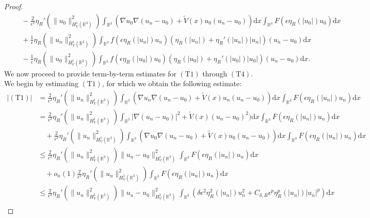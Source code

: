 \documentclass[12pt]{amsart}
\numberwithin{equation}{section}
\theoremstyle{definition}
\begin{document}
\begin{proof}
\begin{align}
     &\quad~- \frac{2}{\epsilon^2} \eta_R'(\|u_0\|_{H^1_{V}(\mathbb{R}^3)}^2) \int_{\mathbb{R}^3}(\nabla u_0\nabla (u_{n}-u_{0})+\tilde V(x)u_0(u_{n}-u_{0})) \text{d}x \int_{\mathbb{R}^3} F(\epsilon \eta_R(|u_0|) u_0)  \text{d}x \tag{T2} \\
    &\quad~+ \frac{1}{\epsilon} \eta_R(\|u_n\|_{H^1_{V}(\mathbb{R}^3)}^2) \int_{\mathbb{R}^3} f(\epsilon\eta_R(|u_n|) u_n) \left(\eta_R(|u_n|) + \eta_R'(|u_n|)|u_n| \right) (u_n-u_0) \text{d}x  \tag{T3}\\
    &\quad~- \frac{1}{\epsilon} \eta_R(\|u_0\|_{H^1_{V}(\mathbb{R}^3)}^2) \int_{\mathbb{R}^3} f(\epsilon \eta_R(|u_0|) u_0) \left(\eta_R(|u_0|) + \eta_R'(|u_0|)|u_0| \right) (u_n-u_0) \text{d}x. \tag{T4}
\end{align}
We now proceed to provide term-by-term estimates for $(\text{T}1)$ through $(\text{T}4)$. We begin by estimating $(\text{T}1)$, for which we obtain the following estimate:
\begin{equation*}
    \begin{aligned}
       \left | (\text{T}1)\right |&=\frac{2}{\epsilon^2} \eta_R'(\|u_n\|_{H^1_{V}(\mathbb{R}^3)}^2) \int_{\mathbb{R}^3}(\nabla u_n\nabla (u_{n}-u_{0})+\tilde V(x)u_n(u_{n}-u_{0})) \text{d}x \int_{\mathbb{R}^3} F(\epsilon \eta_R(|u_n|) u_n) \text{d}x\\
       &=\frac{2}{\epsilon^2} \eta_R'(\|u_n\|_{H^1_{V}(\mathbb{R}^3)}^2) \int_{\mathbb{R}^3}|\nabla (u_n-u_0)|^2+\tilde V(x)(u_{n}-u_{0})^2) \text{d}x \int_{\mathbb{R}^3} F(\epsilon \eta_R(|u_n|) u_n) \text{d}x\\
       &\quad+\frac{2}{\epsilon^2} \eta_R'(\|u_n\|_{H^1_{V}(\mathbb{R}^3)}^2) \int_{\mathbb{R}^3}(\nabla u_0\nabla (u_{n}-u_{0})+\tilde V(x)u_0(u_{n}-u_{0})) \text{d}x \int_{\mathbb{R}^3} F(\epsilon \eta_R(|u_n|) u_n) \text{d}x\\
       &\leq  \frac{2}{\epsilon^2} \eta_R'(\|u_n\|_{H^1_{V}(\mathbb{R}^3)}^2)\|u_n-u_0\|^2_{H^{1}_{V}(\mathbb{R}^3)}\int_{\mathbb{R}^3} F(\epsilon \eta_R(|u_n|) u_n)  \text{d}x\\
       &\quad+o_n(1)\frac{2}{\epsilon^2} \eta_R'(\|u_n\|_{H^1_{V}(\mathbb{R}^3)}^2)\int_{\mathbb{R}^3} F(\epsilon \eta_R(|u_n|) u_n) \text{d}x\\
      & \leq \frac{2}{\epsilon^2} \eta_R'(\|u_n\|_{H^1_{V}(\mathbb{R}^3)}^2) \|u_n-u_0\|^2_{H^{1}_{V}(\mathbb{R}^3)}\int_{\mathbb{R}^{3}}\left ( \delta \epsilon ^{2} \eta _{R}^{2}\left ( \left | u_n\right | \right )u_n^{2}+C_{\delta,R}\epsilon ^{p}\eta _{R}^{p}\left ( \left | u_n\right | \right )\left | u_n\right |^{p}\right )\text{d}x\\

\end{aligned}
\end{equation*}
\end{proof}
\end{document}
